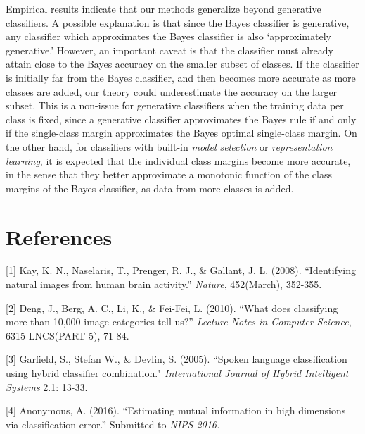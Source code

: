 \documentclass{article}
\begin{document}
Empirical results indicate that our methods generalize beyond generative classifiers.
A possible explanation is that since the Bayes classifier is generative,
any classifier which approximates the Bayes classifier is also `approximately generative.'
However, an important caveat is that the classifier must already attain close to the Bayes accuracy
on the smaller subset of classes.  If the classifier is initially far from the Bayes classifier,
and then becomes more accurate as more classes are added, our theory could underestimate the
accuracy on the larger subset.  This is a non-issue for generative classifiers when the training data per class is fixed,
since a generative classifier approximates the Bayes rule if and only if the single-class margin approximates the
Bayes optimal single-class margin.  On the other hand, for classifiers with built-in \emph{model selection}
or \emph{representation learning}, it is expected that the individual class margins become more accurate,
in the sense that they better approximate a monotonic function of the class margins of the Bayes classifier,
as data from more classes is added.




\section*{References}

\small

[1] Kay, K. N., Naselaris, T., Prenger, R. J., \& Gallant, J. L. (2008). ``Identifying natural images from human brain activity.'' 
\emph{Nature}, 452(March), 352-355.

[2] Deng, J., Berg, A. C., Li, K., \& Fei-Fei, L. (2010). ``What does classifying more than 10,000 image categories tell us?'' \emph{Lecture Notes in Computer Science}, 6315 LNCS(PART 5), 71-84. 

[3] Garfield, S., Stefan W., \& Devlin, S. (2005). ``Spoken language classification using hybrid classifier combination." 
\emph{International Journal of Hybrid Intelligent Systems} 2.1: 13-33.

[4] Anonymous, A. (2016). ``Estimating mutual information in high dimensions via classification error.''  Submitted to 
\emph{NIPS 2016.}
\end{document}
